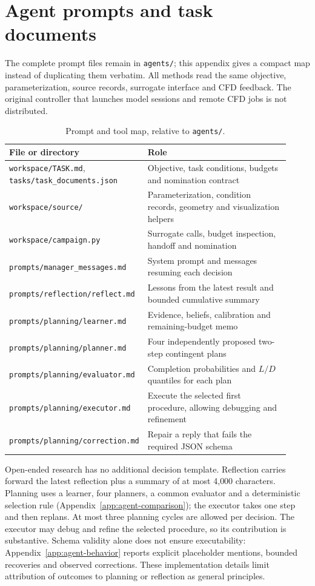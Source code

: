 \section{Agent prompts and task documents}
\label{app:prompts}

The complete prompt files remain in \texttt{agents/}; this appendix gives a
compact map instead of duplicating them verbatim. All methods read the same
objective, parameterization, source records, surrogate interface and CFD
feedback. The original controller that launches model sessions and remote
CFD jobs is not distributed.

\begin{table}[htbp]
\centering\small
\caption{Prompt and tool map, relative to \texttt{agents/}.}
\begin{tabular}{p{0.40\linewidth}p{0.52\linewidth}}
\toprule
File or directory & Role \\
\midrule
\texttt{workspace/TASK.md}, \texttt{tasks/task\_documents.json} & Objective, task conditions, budgets and nomination contract \\
\texttt{workspace/source/} & Parameterization, condition records, geometry and visualization helpers \\
\texttt{workspace/campaign.py} & Surrogate calls, budget inspection, handoff and nomination \\
\texttt{prompts/manager\_messages.md} & System prompt and messages resuming each decision \\
\texttt{prompts/reflection/reflect.md} & Lessons from the latest result and bounded cumulative summary \\
\texttt{prompts/planning/learner.md} & Evidence, beliefs, calibration and remaining-budget memo \\
\texttt{prompts/planning/planner.md} & Four independently proposed two-step contingent plans \\
\texttt{prompts/planning/evaluator.md} & Completion probabilities and $L/D$ quantiles for each plan \\
\texttt{prompts/planning/executor.md} & Execute the selected first procedure, allowing debugging and refinement \\
\texttt{prompts/planning/\allowbreak correction.md} & Repair a reply that fails the required JSON schema \\
\bottomrule
\end{tabular}
\end{table}

Open-ended research has no additional decision template. Reflection carries
forward the latest reflection plus a summary of at most 4{,}000 characters.
Planning uses a learner, four planners, a common evaluator and a deterministic
selection rule (Appendix~\ref{app:agent-comparison}); the executor takes one
step and then replans. At most three planning cycles are allowed per decision.
The executor may debug and refine the selected procedure, so its contribution
is substantive. Schema validity alone does not ensure executability:
Appendix~\ref{app:agent-behavior} reports explicit placeholder mentions,
bounded recoveries and observed corrections. These implementation details
limit attribution of outcomes to planning or reflection as general principles.
